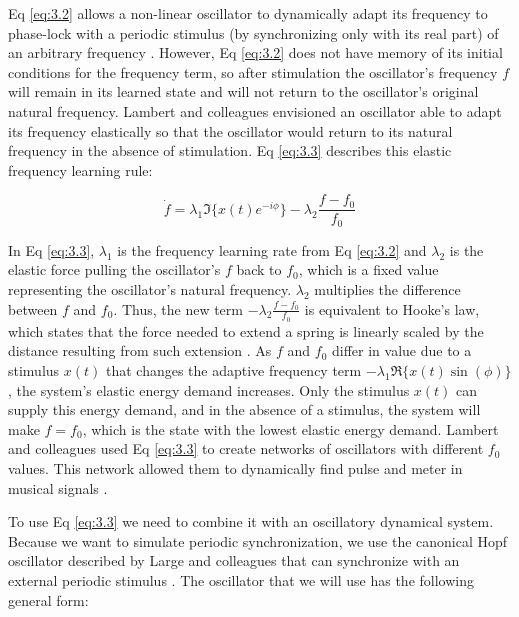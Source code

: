 \documentclass[10pt,letterpaper]{article}
\begin{document}
Eq \eqref{eq:3.2} allows a non-linear oscillator to dynamically adapt its frequency to phase-lock with a periodic stimulus (by synchronizing only with its real part) of an arbitrary frequency \cite{righetti2006dynamic}. However, Eq \eqref{eq:3.2} does not have memory of its initial conditions for the frequency term, so after stimulation the oscillator's frequency $f$ will remain in its learned state and will not return to the oscillator's original natural frequency. Lambert and colleagues \cite{lambert2016adaptive} envisioned an oscillator able to adapt its frequency elastically so that the oscillator would return to its natural frequency in the absence of stimulation. Eq \eqref{eq:3.3} describes this elastic frequency learning rule:

\begin{equation}
\dot{f} = \lambda_1 \Im \{ x(t) e^{ -i \phi} \} - \lambda_2 \frac{f-f_0}{f_0} \label{eq:3.3}
\end{equation}

In Eq \eqref{eq:3.3}, $\lambda_1$ is the frequency learning rate from Eq \eqref{eq:3.2} and $\lambda_2$ is the elastic force pulling the oscillator's $f$ back to $f_0$, which is a fixed value representing the oscillator's natural frequency. $\lambda_2$ multiplies the difference between $f$ and $f_0$. Thus, the new term $−\lambda_2 \frac{f-f_0}{f_0}$ is equivalent to Hooke's law, which states that the force needed to extend a spring is linearly scaled by the distance resulting from such extension \cite{lambert2016adaptive}. As $f$ and $f_0$ differ in value due to a stimulus $x(t)$ that changes the adaptive frequency term $-\lambda_1 \Re \{ x(t) \sin(\phi) \}$, the system's elastic energy demand increases. Only the stimulus $x(t)$ can supply this energy demand, and in the absence of a stimulus, the system will make $f = f_0$, which is the state with the lowest elastic energy demand. Lambert and colleagues \cite{lambert2016adaptive} used Eq \eqref{eq:3.3} to create networks of oscillators with different $f_0$ values. This network allowed them to dynamically find pulse and meter in musical signals \cite{lambert2016adaptive}.

To use Eq \eqref{eq:3.3} we need to combine it with an oscillatory dynamical system. Because we want to simulate periodic synchronization, we use the canonical Hopf oscillator described by Large and colleagues that can synchronize with an external periodic stimulus \cite{large2010canonical, kim2015signal}. The oscillator that we will use has the following general form:
\end{document}
